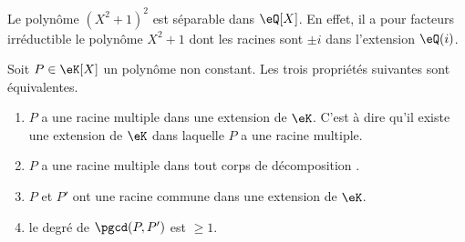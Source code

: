 \begin{example}
    Le polynôme \( (X^2+1)^2\) est séparable dans \( \eQ[X]\). En effet, il a pour facteurs irréductible le polynôme \( X^2+1\) dont les racines sont \( \pm i\) dans l'extension \( \eQ(i)\).
\end{example}

\begin{proposition}  \label{PropolyeZff}
    Soit \( P\in \eK[X]\) un polynôme non constant. Les trois propriétés suivantes sont équivalentes.
    \begin{enumerate}
        \item\label{ItemdqPFUi}
            \( P\) a une racine multiple dans une extension de \( \eK\). C'est à dire qu'il existe une extension de \( \eK\) dans laquelle \( P\) a une racine multiple.
        \item\label{ItemdqPFUib}
            \( P\) a une racine multiple dans tout corps de décomposition .
        \item\label{ItemdqPFUii}
            \( P\) et \( P'\) ont une racine commune dans une extension de \( \eK\).
        \item\label{ItemdqPFUiii}
            le degré de \( \pgcd(P,P')\) est \( \geq 1\).
    \end{enumerate}
\end{proposition}

